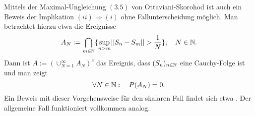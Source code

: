 \begin{remark}
    Mittels der Maximal-Ungleichung $(3.5)$ von Ottaviani-Skorohod ist auch ein Beweis der Implikation $(ii) \Rightarrow (i)$ ohne Fallunterscheidung möglich. Man betrachtet hierzu etwa die Ereignisse 
    $$
        A_N := \bigcap_{m \in \mathbb{N}}\{\sup_{n > m} \lvert\lvert S_n - S_m \rvert\rvert > \frac{1}{N}\}, \quad N \in \mathbb{N}.                                                                                                                        
    $$
    Dann ist $A := (\cup_{N=1}^{\infty} A_N)^c$ das Ereignis, dass $(S_n)_{n \in \mathbb{N}}$ eine Cauchy-Folge ist und man zeigt 
    $$
        \forall N \in \mathbb{N}: \quad P(A_N) = 0. 
    $$
    Ein Beweis mit dieser Vorgehensweise für den skalaren Fall findet sich etwa \cite[Theorem 14.2]{bauer}. Der allgemeine Fall funktioniert vollkommen analog.
\end{remark}



